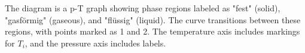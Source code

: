 The diagram is a p-T graph showing phase regions labeled as "fest" (solid), "gasförmig" (gaseous), and "flüssig" (liquid). The curve transitions between these regions, with points marked as 1 and 2. The temperature axis includes markings for \( T_i \), and the pressure axis includes labels.